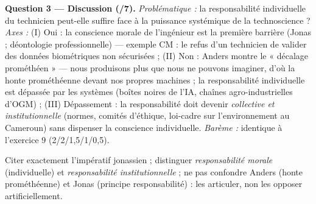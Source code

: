 \documentclass[11pt]{article}
\newcommand{\cle}[1]{{\popxbold\color{popdark}#1}}
\begin{document}
\begin{corrige}
\textbf{Question 3 — Discussion (/7).} \emph{Problématique :} la responsabilité individuelle du technicien peut-elle suffire face à la puissance systémique de la technoscience ? \emph{Axes :} (I) Oui : la conscience morale de l'ingénieur est la première barrière (Jonas ; déontologie professionnelle) — exemple CM : le refus d'un technicien de valider des données biométriques non sécurisées ; (II) Non : Anders montre le « décalage prométhéen » — nous produisons plus que nous ne pouvons imaginer, d'où la \cle{honte prométhéenne} devant nos propres machines ; la responsabilité individuelle est dépassée par les systèmes (boîtes noires de l'IA, chaînes agro-industrielles d'OGM) ; (III) Dépassement : la responsabilité doit devenir \emph{collective et institutionnelle} (normes, comités d'éthique, loi-cadre sur l'environnement au Cameroun) sans dispenser la conscience individuelle. \emph{Barème :} identique à l'exercice 9 (2/2/1,5/1/0,5).
\end{corrige}

\begin{attention}
Citer exactement l'impératif jonassien ; distinguer \emph{responsabilité morale} (individuelle) et \emph{responsabilité institutionnelle} ; ne pas confondre Anders (honte prométhéenne) et Jonas (principe responsabilité) : les articuler, non les opposer artificiellement.
\end{attention}
\end{document}
